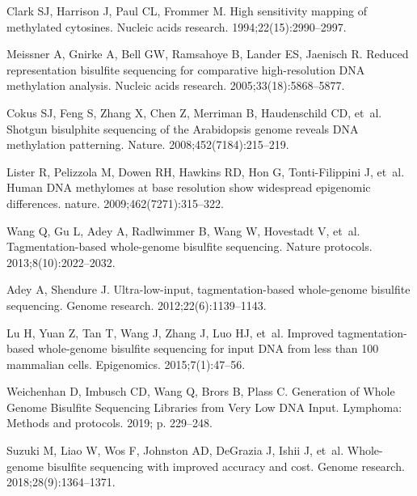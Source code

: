 \documentclass[10pt,draft,letterpaper]{article}
\begin{document}
\nolinenumbers

% 

\begin{thebibliography}{10}

Clark SJ, Harrison J, Paul CL, Frommer M.
\newblock High sensitivity mapping of methylated cytosines.
\newblock Nucleic acids research. 1994;22(15):2990--2997.

Meissner A, Gnirke A, Bell GW, Ramsahoye B, Lander ES, Jaenisch R.
\newblock Reduced representation bisulfite sequencing for comparative high-resolution DNA methylation analysis.
\newblock Nucleic acids research. 2005;33(18):5868--5877.

Cokus SJ, Feng S, Zhang X, Chen Z, Merriman B, Haudenschild CD, et~al.
\newblock Shotgun bisulphite sequencing of the Arabidopsis genome reveals DNA methylation patterning.
\newblock Nature. 2008;452(7184):215--219.

Lister R, Pelizzola M, Dowen RH, Hawkins RD, Hon G, Tonti-Filippini J, et~al.
\newblock Human DNA methylomes at base resolution show widespread epigenomic differences.
\newblock nature. 2009;462(7271):315--322.

Wang Q, Gu L, Adey A, Radlwimmer B, Wang W, Hovestadt V, et~al.
\newblock Tagmentation-based whole-genome bisulfite sequencing.
\newblock Nature protocols. 2013;8(10):2022--2032.

Adey A, Shendure J.
\newblock Ultra-low-input, tagmentation-based whole-genome bisulfite sequencing.
\newblock Genome research. 2012;22(6):1139--1143.

Lu H, Yuan Z, Tan T, Wang J, Zhang J, Luo HJ, et~al.
\newblock Improved tagmentation-based whole-genome bisulfite sequencing for input DNA from less than 100 mammalian cells.
\newblock Epigenomics. 2015;7(1):47--56.

Weichenhan D, Imbusch CD, Wang Q, Brors B, Plass C.
\newblock Generation of Whole Genome Bisulfite Sequencing Libraries from Very Low DNA Input.
\newblock Lymphoma: Methods and protocols. 2019; p. 229--248.

Suzuki M, Liao W, Wos F, Johnston AD, DeGrazia J, Ishii J, et~al.
\newblock Whole-genome bisulfite sequencing with improved accuracy and cost.
\newblock Genome research. 2018;28(9):1364--1371.


\end{thebibliography}
\end{document}
